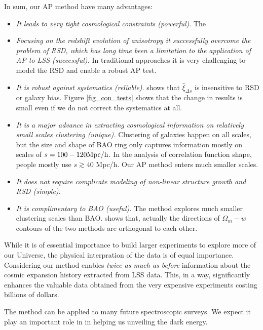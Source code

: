\documentclass[useAMS,usenatbib]{mnras}
\begin{document}
In sum, our AP method have many advantages:
\begin{itemize}
 \item {\it It leads to very tight cosmological constraints (powerful)}. The 
 \item {\it Focusing on the redshift evolution of anisotropy it successfully overcome the problem of RSD, 
 which has long time been a limitation to the application of AP to LSS (successful).}
 In traditional approaches it is very challenging to model the RSD and enable a robust AP test.
 \item {\it It is robust against systematics (reliable)}. 
 \cite{Li2016} shows that $\hat\xi_{\Delta s}$ is insensitive to RSD or galaxy bias.
 Figure \ref{fig_con_tests} shows that the change in results is small even if we do not correct the systematics at all.
 \item {\it It is a major advance in extracting cosmological information on relatively small scales clustering (unique).} 
 Clustering of galaxies happen on all scales,
but the size and shape of BAO ring only captures information mostly on scales of $s=100-120 {\rm Mpc/h}$.
In the analysis of correlation function shape, people mostly use $s\gtrsim 40$ Mpc/h.
Our AP method enters much smaller scales.
 \item {\it It does not require complicate modeling of non-linear structure growth and RSD (simple).}
 \item {\it It is complimentary to BAO (useful).}
 The method explores much smaller clustering scales than BAO. 
 \cite{Li2016} shows that, actually the directions of $\Omega_m-w$ contours of the two methods are orthogonal to each other.
\end{itemize}


While it is of essential importance to build larger experiments to 
explore more of our Universe,
the physical interpration of the data is of equal importance.
Considering our method enables {\it twice as much as before} information about the cosmic expansion history extracted from LSS data.
This, in a way, significantly enhances the valuable data obtained from the very expensive experiments costing billions of dollars.

The method can be applied to many future spectroscopic surveys. 
We expect it play an important role in in helping us unveiling the dark energy.
\end{document}
